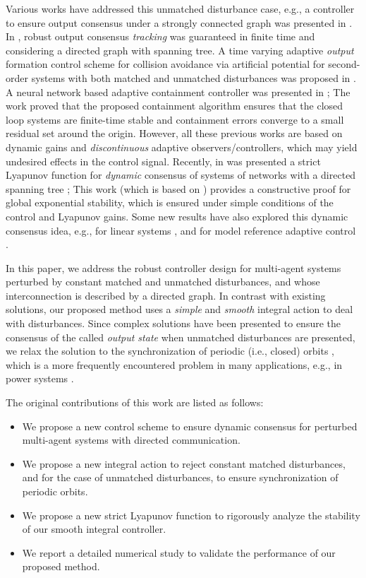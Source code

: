 \documentclass[journal,twoside]{IEEEtran}
\begin{document}
Various works have addressed this unmatched disturbance case, e.g.,  a controller to ensure output consensus under a strongly connected graph was presented in \cite{WANGetal21}. 
In \cite{GUetal21}, robust output consensus {\it tracking} was guaranteed in finite time and considering a directed graph with spanning tree. 
A time varying adaptive {\it output} formation control scheme for collision avoidance via artificial potential for second-order systems with both matched and unmatched disturbances was proposed in \cite{ZHENGetal23}. 
A neural network based adaptive containment controller was presented in \cite{XIAOetal22}; The work proved that the proposed containment algorithm ensures that the closed loop systems are finite-time stable and containment errors converge to a small residual set around the origin. 
However, all these previous works are based on dynamic gains and {\it discontinuous} adaptive observers/controllers, which may yield undesired effects in the control signal.
Recently, in \cite{PANLORSUK} was presented a strict Lyapunov function for {\it dynamic} consensus of systems of networks with a directed spanning tree \cite{LIDUACHE, OLFMUR}; This work (which is based on \cite{PANLOR17}) provides a constructive proof for global exponential stability, which is ensured under simple conditions of the control and Lyapunov gains.
Some new results have also explored this dynamic consensus idea, e.g., for linear systems \cite{DUTetal22}, and for model reference adaptive control \cite{DUTetal23, DUTetal23a}.

In this paper, we address the robust controller design for multi-agent systems perturbed by constant matched and unmatched disturbances, and whose interconnection is described by a directed graph. 
In contrast with existing solutions, our proposed method uses a {\it simple} and {\it smooth} integral action to deal with disturbances.
Since complex solutions have been presented to ensure the consensus of the called {\it output state} when unmatched disturbances are presented, we relax the solution to the synchronization of periodic (i.e., closed) orbits \cite{SCASEP, ORTetal20}, which is a more frequently encountered problem  in many applications, e.g., in power systems \cite{BATFOSOLI, SAIISHISH, ANGOLITAB}. 

The original contributions of this work are listed as follows:
\begin{itemize}
    \item We propose a new control scheme to ensure dynamic consensus for perturbed multi-agent systems with directed communication.
    \item We propose a new integral action to reject constant matched disturbances, and for the case of unmatched disturbances, to ensure synchronization of periodic orbits.
    \item We propose a new strict Lyapunov function to rigorously analyze the stability of our smooth integral controller.
    \item We report a detailed numerical study to validate the performance of our proposed method.
\end{itemize}
  
\end{document}
